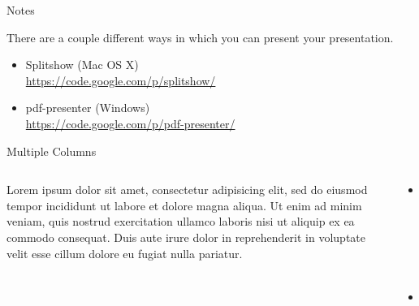 \documentclass[newPxFont]{beamer}
\begin{document}

\begin{frame}{Notes}

There are a couple different ways in which you can present your presentation.

\begin{itemize}
\item Splitshow (Mac OS X)\\\url{https://code.google.com/p/splitshow/}
\item pdf-presenter (Windows)\\\url{https://code.google.com/p/pdf-presenter/}
\end{itemize}
\end{frame}



\begin{frame}{Multiple Columns}
\begin{columns}
\begin{column}{.48\linewidth}
		Lorem ipsum dolor sit amet, consectetur adipisicing elit, sed do eiusmod
		tempor incididunt ut labore et dolore magna aliqua. Ut enim ad minim veniam,
		quis nostrud exercitation ullamco laboris nisi ut aliquip ex ea commodo
		consequat. Duis aute irure dolor in reprehenderit in voluptate velit esse
		cillum dolore eu fugiat nulla pariatur.
\end{column}
\begin{column}{.48\linewidth}
		\begin{itemize}
        	\item Point 1
        	\item Point 2
		\end{itemize}
	\end{column}
	\end{columns}
\end{frame}
\end{document}
